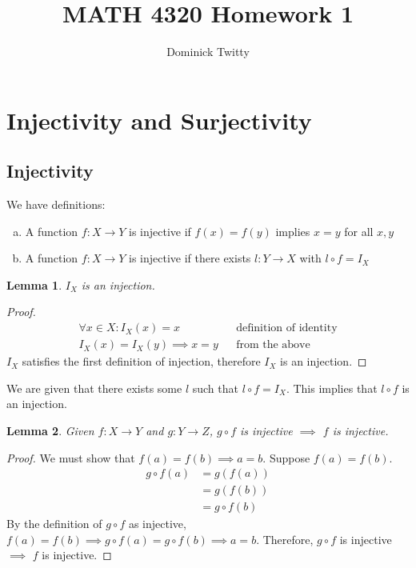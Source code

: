 \documentclass[12pt]{article}
\newtheorem{lemma}{Lemma}
\begin{document}
\title{MATH 4320 Homework 1}
\author{Dominick Twitty}
\maketitle


\section{Injectivity and Surjectivity}
\subsection*{Injectivity}
We have definitions:
\begin{enumerate}[(a)]
\item A function $f : X \rightarrow Y$ is injective if $f(x) = f(y)$ implies $x = y$ for all $x, y$
\item A function $f : X \rightarrow Y$ is injective if there exists $l : Y \rightarrow X$ with $l \circ f = I_X$
\end{enumerate}

\begin{lemma}
$I_X$ is an injection.
\end{lemma}
\begin{proof}
\begin{align*}
\forall x \in X : I_X(x) = x & & \text{definition of identity}\\
I_X(x) = I_X(y) \implies x = y & & \text{from the above}
\end{align*}
$I_X$ satisfies the first definition of injection, therefore $I_X$ is an injection. 
\end{proof}

We are given that there exists some $l$ such that $l \circ f = I_X$. This implies that $l \circ f$ is an injection.

\begin{lemma}
Given $f : X \rightarrow Y$ and $g : Y \rightarrow Z$,
$g \circ f$ is injective $\implies$ $f$ is injective.
\end{lemma}
\begin{proof}
We must show that $f(a) = f(b) \implies a = b$. Suppose $f(a) = f(b)$.
\begin{align*}
g \circ f(a) &= g(f(a))\\
&= g(f(b))\\
&= g\circ f(b)
\end{align*}
By the definition of $g \circ f$ as injective, $f(a) = f(b) \implies g \circ f(a) = g \circ f(b) \implies a = b$. 
Therefore, $g \circ f$ is injective $\implies$ $f$ is injective.
\end{proof}
\end{document}
